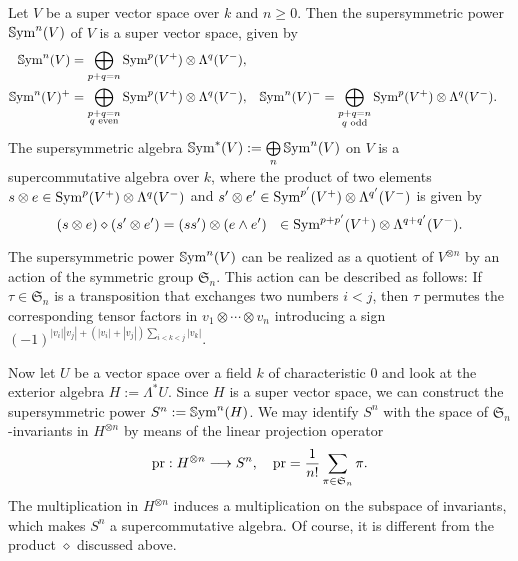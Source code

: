 \begin{definition}
Let $V$ be a super vector space over $k$ and $n\geq 0$. Then the supersymmetric power $\operatorname{\mathbb Sym}^n(V)$ of $V$ is a super vector space, given by
\begin{align*}
\operatorname{\mathbb Sym}^n(V) &= \bigoplus_{p+q=n} \operatorname{Sym}^p(V^{+}) \otimes \Lambda^q(V^{-}), \\
\operatorname{\mathbb Sym}^n(V)^{+} &= \bigoplus_{\substack{p+q=n \\ q\text{ even} }} \operatorname{Sym}^p(V^{+}) \otimes \Lambda^q(V^{-}), &
\operatorname{\mathbb Sym}^n(V)^{-} &= \bigoplus_{\substack{p+q=n \\ q\text{ odd} }} \operatorname{Sym}^p(V^{+}) \otimes \Lambda^q(V^{-}).
\end{align*}
The supersymmetric algebra $\operatorname{\mathbb Sym}^*(V):= \bigoplus\limits_n \operatorname{\mathbb Sym}^n(V)$ on $V$ is a supercommutative algebra over $k$, where the product of two elements $s\otimes e \in \operatorname{Sym}^p(V^{+}) \otimes \Lambda^q(V^{-})$ and $s'\otimes e' \in \operatorname{Sym}^{p'}(V^{+}) \otimes \Lambda^{q'}(V^{-})$ is given by 
$$
(s\otimes e)\diamond (s'\otimes e') = (s s')\otimes (e\wedge e') \ \  \in \operatorname{Sym}^{p+p'}(V^{+}) \otimes \Lambda^{q+q'}(V^{-}).
$$
\end{definition}
\begin{remark}
The supersymmetric power $\operatorname{\mathbb Sym}^n (V)$ can be realized as a quotient of $V^{\otimes n}$ by an action of the symmetric group $\mathfrak S_n$. This action can be described as follows: If $\tau\in \mathfrak S_n$ is a transposition that exchanges two numbers $i<j$, then $\tau$ permutes the corresponding tensor factors in $v_1\otimes  \cdots\otimes v_n$ introducing a sign
$(-1)^{|v_i||v_j|+(|v_i|+|v_j|)\sum_{i<k<j} |v_k|}$.
\end{remark}


Now let $U$ be a vector space over a field $k$ of characteristic $0$ and look at the exterior algebra $H:= \Lambda^* U$. 
Since $H$ is a super vector space, we can construct the supersymmetric power $S^n:= \operatorname{\mathbb Sym}^n( H)$.
We may identify $S^n$ with the space of $\mathfrak S_n$-invariants in $H^{\otimes n}$ by means of the linear projection operator
$$
\operatorname{pr} : H^{\otimes n} \longrightarrow S^n , \quad \operatorname{pr} = \frac{1}{n!}\sum_{\pi \in\mathfrak S_n} \pi.
$$
The multiplication in $H^{\otimes n}$ induces a multiplication on the subspace of invariants, which makes $S^n$ a supercommutative algebra. Of course, it is different from the product $\diamond$ discussed above.

